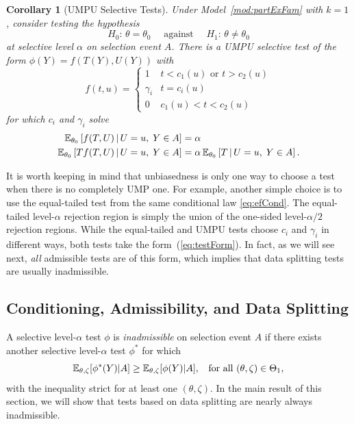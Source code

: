 \documentclass{article}
\newtheorem{corollary}[theorem]{Corollary}
\theoremstyle{definition}
\begin{document}
\begin{corollary}[UMPU Selective Tests]\label{cor:selUmpu}
   Under Model~\ref{mod:partExFam} with $k=1$, consider testing the hypothesis
   \begin{equation}\label{eq:uniNullSel}
     H_0:\,\theta = \theta_0 \quad \text{ against }
     \quad H_1:\,\theta     \neq \theta_0
   \end{equation}
   at selective level $\alpha$ on selection event $A$.
   There is a UMPU selective test of the form $\phi(Y) = f(T(Y),U(Y))$ with
   \begin{equation}
     f(t,u) = \left\{\begin{matrix}
         1 & t < c_1(u) \text{ or } t > c_2(u)\\
         \gamma_i & t = c_i(u)\\
         0 & c_1(u) < t < c_2(u)
       \end{matrix}\right.
   \end{equation}
   for which $c_i$ and $\gamma_i$ solve
   \begin{align}\label{eq:selSolveLev}
     \mathbb{E}_{\theta_0}\left[f(T, U)\,|\,  U=u,\; Y\in A\right] &= \alpha \\
     \label{eq:selSolveUnbi}
     \mathbb{E}_{\theta_0}\left[Tf(T, U)\,|\, U=u,\; Y\in A \right]
     &=  \alpha\,\mathbb{E}_{\theta_0}\left[T\,|\, U=u,\; Y\in A\right].
   \end{align}
\end{corollary}

It is worth keeping in mind that unbiasedness is only one way to choose a test when there is no completely UMP one. For example, another simple choice is to use the equal-tailed test from the same conditional law \eqref{eq:efCond}. The equal-tailed level-$\alpha$ rejection region is simply the union of the one-sided level-$\alpha/2$ rejection regions. While the equal-tailed and UMPU tests choose $c_i$ and $\gamma_i$ in different ways, both tests take the form~(\ref{eq:testForm}). In fact, as we will see next, {\em all} admissible tests are of this form, which implies that data splitting tests are usually inadmissible.

\subsection{Conditioning, Admissibility, and Data Splitting}\label{sec:admissibility}

A selective level-$\alpha$ test $\phi$ is {\em inadmissible} on selection event $A$ if there exists another selective level-$\alpha$ test $\phi^*$ for which
\begin{equation}
  \mathbb{E}_{\theta,\zeta}[\phi^*(Y) | A] \geq \mathbb{E}_{\theta,\zeta}[\phi(Y) | A], \;\;\text{ for all } (\theta,\zeta)\in \Theta_1,
\end{equation}
with the inequality strict for at least one $(\theta,\zeta)$. In the main result of this section, we will show that tests based on data splitting are nearly always inadmissible.
\end{document}
